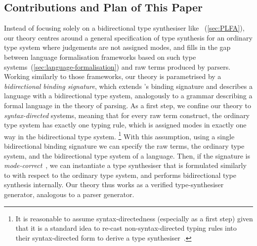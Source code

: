 \subsection{Contributions and Plan of This Paper}


Instead of focusing solely on a bidirectional type synthesiser like \citet{Wadler2022}~(\cref{sec:PLFA}), our theory centres around a general specification of type synthesis for an ordinary type system where judgements are not assigned modes, and fills in the gap between language formalisation frameworks based on such type systems~(\cref{sec:language-formalisation}) and raw terms produced by parsers.
Working similarly to those frameworks, our theory is parametrised by a \emph{bidirectional binding signature}, which extends \citeauthor*{Aczel1978}'s binding signature and describes a language with a bidirectional type system, analogously to a grammar describing a formal language in the theory of parsing.
As a first step, we confine our theory to \emph{syntax-directed} systems, meaning that for every raw term construct, the ordinary type system has exactly one typing rule, which is assigned modes in exactly one way in the bidirectional type system.%
\footnote{It is reasonable to assume syntax-directedness (especially as a first step) given that it is a standard idea to re-cast non-syntax-directed typing rules into their syntax-directed form to derive a type synthesiser~\citep{Peyton-Jones2007}.}
With this assumption, using a single bidirectional binding signature we can specify the raw terms, the ordinary type system, and the bidirectional type system of a language.
Then, if the signature is \emph{mode-correct}~\citep[Section~3.1]{Dunfield2021}, we can instantiate a type synthesiser that is formulated similarly to  with respect to the ordinary type system, and performs bidirectional type synthesis internally.
Our theory thus works as a verified type-synthesiser generator, analogous to a parser generator.

